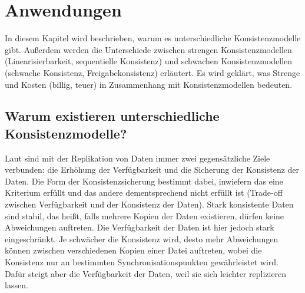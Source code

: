 \chapter{Anwendungen}

In diesem Kapitel wird beschrieben, warum es unterschiedliche Konsistenzmodelle gibt. Außerdem werden die Unterschiede zwischen strengen Konsistenzmodellen (Linearisierbarkeit, sequentielle Konsistenz) und schwachen Konsistenzmodellen (schwache Konsistenz, Freigabekonsistenz) erläutert. Es wird geklärt, was Strenge und Kosten (billig, teuer) in Zusammenhang mit Konsistenzmodellen bedeuten.

\section{Warum existieren unterschiedliche Konsistenzmodelle?}

Laut \cite{Malte:97} sind mit der Replikation von Daten immer zwei gegensätzliche Ziele verbunden: die Erhöhung der Verfügbarkeit und die Sicherung der Konsistenz der Daten. Die Form der Konsistenzsicherung bestimmt dabei, inwiefern das eine Kriterium erfüllt und das andere dementsprechend nicht erfüllt ist (Trade-off zwischen Verfügbarkeit und der Konsistenz der Daten). Stark konsistente Daten sind stabil, das heißt, falls mehrere Kopien der Daten existieren, dürfen keine Abweichungen auftreten. Die Verfügbarkeit der Daten ist hier jedoch stark eingeschränkt. Je schwächer die Konsistenz wird, desto mehr Abweichungen können zwischen verschiedenen Kopien einer Datei auftreten, wobei die Konsistenz nur an bestimmten Synchronisationspunkten gewährleistet wird. Dafür steigt aber die Verfügbarkeit der Daten, weil sie sich leichter replizieren lassen.
